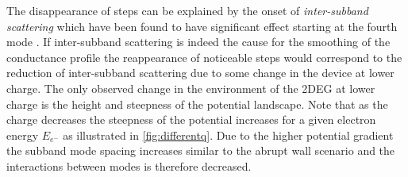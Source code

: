 The disappearance of steps can be explained by the onset of \emph{inter-subband scattering} which have been found to have significant effect starting at the fourth mode \cite{Lehmann2011}. If inter-subband scattering is indeed the cause for the smoothing of the conductance profile the reappearance of noticeable steps would correspond to the reduction of inter-subband scattering due to some change in the device at lower charge. The only observed change in the environment of the 2DEG at lower charge is the height and steepness of the potential landscape.
Note that as the charge decreases the steepness of the potential increases for a given electron energy $E_{e^-}$ as illustrated in \cref{fig:differentq}. Due to the higher potential gradient the subband mode spacing increases similar to the abrupt wall scenario and the interactions between modes is therefore decreased.
